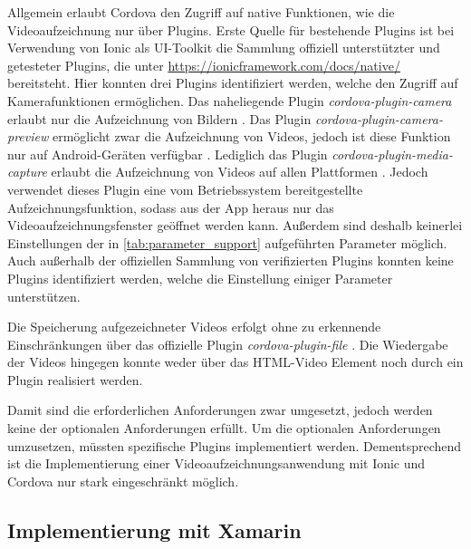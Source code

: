 Allgemein erlaubt Cordova den Zugriff auf native Funktionen, wie die Videoaufzeichnung nur über Plugins.
Erste Quelle für bestehende Plugins ist bei Verwendung von Ionic als UI-Toolkit die Sammlung offiziell unterstützter und getesteter Plugins, die unter \url{https://ionicframework.com/docs/native/} bereitsteht.
Hier konnten drei Plugins identifiziert werden, welche den Zugriff auf Kamerafunktionen ermöglichen.
Das naheliegende Plugin \textit{cordova-plugin-camera} erlaubt nur die Aufzeichnung von Bildern \cite{Cordova_Camera}.
Das Plugin \textit{cordova-plugin-camera-preview} ermöglicht zwar die Aufzeichnung von Videos, jedoch ist diese Funktion nur auf Android-Geräten verfügbar \cite{Cordova_CameraPreview}.
Lediglich das Plugin \textit{cordova-plugin-media-capture} erlaubt die Aufzeichnung von Videos auf allen Plattformen \cite{Cordova_MediaCapture}.
Jedoch verwendet dieses Plugin eine vom Betriebssystem bereitgestellte Aufzeichnungsfunktion, sodass aus der App heraus nur das Videoaufzeichnungsfenster geöffnet werden kann.
Außerdem sind deshalb keinerlei Einstellungen der in \autoref{tab:parameter_support} aufgeführten Parameter möglich.
Auch außerhalb der offiziellen Sammlung von verifizierten Plugins konnten keine Plugins identifiziert werden, welche die Einstellung einiger Parameter unterstützen.

Die Speicherung aufgezeichneter Videos erfolgt ohne zu erkennende Einschränkungen über das offizielle Plugin \textit{cordova-plugin-file} \cite{Cordova_File}.
Die Wiedergabe der Videos hingegen konnte weder über das HTML-Video Element noch durch ein Plugin realisiert werden. 

Damit sind die erforderlichen Anforderungen zwar umgesetzt, jedoch werden keine der optionalen Anforderungen erfüllt.
Um die optionalen Anforderungen umzusetzen, müssten spezifische Plugins implementiert werden.
Dementsprechend ist die Implementierung einer Videoaufzeichnungsanwendung mit Ionic und Cordova nur stark eingeschränkt möglich.


\subsection{Implementierung mit Xamarin}
\label{sec:evaluation_xamarin}

